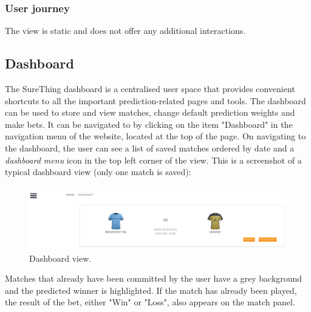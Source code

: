 \subsubsection*{User journey}
\label{subsec:playedmatchviewuserjourney}
The view is static and does not offer any additional interactions.

\subsection{Dashboard}
\label{subsec:dashboard}
The SureThing dashboard is a centralised user space that provides convenient shortcuts to all the important prediction-related pages and tools. The dashboard can be used to store and view matches, change default prediction weights and make bets. It can be navigated to by clicking on the item "Dashboard" in the navigation menu of the website, located at the top of the page. On navigating to the dashboard, the user can see a list of saved matches ordered by date and a \emph{dashboard menu} icon in the top left corner of the view. This is a screenshot of a typical dashboard view (only one match is saved):

\begin{figure}[H]
	\begin{center}
		\includegraphics[width=.90\textwidth]{impl/images/typicalDashboard}
		\caption{Dashboard view.} \label{fig:typicaldashboard}
	\end{center}
\end{figure}

Matches that already have been committed by the user have a grey background and the predicted winner is highlighted. If the match has already been played, the result of the bet, either "Win" or "Loss", also appears on the match panel.

